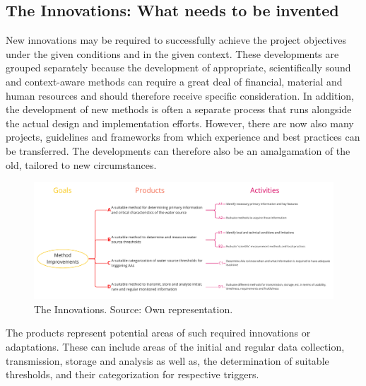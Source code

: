 \subsection{The Innovations: What needs to be invented}\label{subsubsec:innovations}
New innovations may be required to successfully achieve the project objectives under the given conditions and in the given context. These developments are grouped separately because the development of appropriate, scientifically sound and context-aware methods can require a great deal of financial, material and human resources and should therefore receive specific consideration. In addition, the development of new methods is often a separate process that runs alongside the actual design and implementation efforts. However, there are now also many projects, guidelines and frameworks from which experience and best practices can be transferred. The developments can therefore also be an amalgamation of the old, tailored to new circumstances.\newline

\begin{figure}[!htp]
    \centering
    \includegraphics[width=1.0\textwidth]{figures/2023_MA_results_innovation.pdf}
    \decoRule
    \caption[PRC: The Innovations]{The Innovations. Source: Own representation.}
    \label{fig:res_innovations}
\end{figure}

The products represent potential areas of such required innovations or adaptations. These can include areas of the initial and regular data collection, transmission, storage and analysis as well as, the determination of suitable thresholds, and their categorization for respective triggers.

